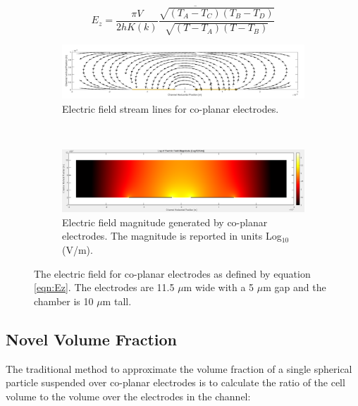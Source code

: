  \begin{equation}
    E_z = \overline{\frac{\pi V}{2hK(k)} \frac{\sqrt{(T_A-T_C)(T_B-T_D)}}{\sqrt{(T-T_A)(T-T_B)}}}
    \label{eqn:Ez}
 \end{equation}
 
    
     \begin{figure}[h]
    \centering
    \begin{subfigure}[b]{\textwidth}
        \centering
        \includegraphics[width=\textwidth]{images/electricFieldStreamLines.png}
        \caption{Electric field stream lines for co-planar electrodes.}
        \label{fig:electricFieldStreamLines}
    \end{subfigure}
    \\
    \vspace{0.2 in}
    \begin{subfigure}[b]{\textwidth}
        \centering
        \includegraphics[width=\textwidth]{images/EfieldMagnitude.png}
        \caption{Electric field magnitude generated by co-planar electrodes. The magnitude is reported in units Log$_{10}$(V/m).}
        \label{fig:electricFieldMag}
    \end{subfigure} 
    \caption[Electric Field of Co-planar Electrodes]{The electric field for co-planar electrodes as defined by equation \ref{eqn:Ez}. The electrodes are 11.5 $\mu$m wide with a 5 $\mu$m gap and the chamber is 10 $\mu$m tall.}
    \label{fig:electricFieldPlots}
 \end{figure}

\newpage

\subsection{Novel Volume Fraction}
\label{sec:novelVolumeFraction}
\par The traditional method to approximate the volume fraction of a single spherical particle suspended over co-planar electrodes is to calculate the ratio of the cell volume to the volume over the electrodes in the channel:


